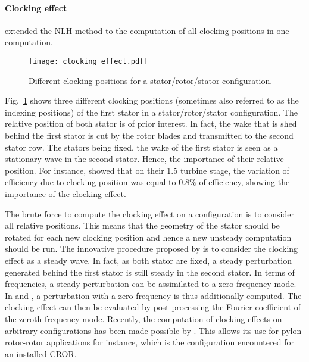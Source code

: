 \paragraph{Clocking effect}
\citet{He2002} extended the NLH method to
the computation of all clocking positions in one computation.
\begin{figure}[htbp]
  \centering 
  \texttt{[image: clocking\_effect.pdf]}
  \caption{Different clocking positions for a stator/rotor/stator
  configuration.}
  \label{fig:sm_nlh_clocking_effect}
\end{figure}
Fig.~\ref{fig:sm_nlh_clocking_effect} shows three
different clocking positions (sometimes also referred 
to as the indexing positions)
of the first stator
in a stator/rotor/stator configuration.
The relative position of both stator is of
prior interest. In fact, the wake that is shed behind the first stator
is cut by the rotor blades and transmitted to 
the second stator row. The stators being fixed, the wake of
the first stator is seen as a stationary wave in the second stator.
Hence, the importance of their relative position. For instance,
\citet{Huber1996} showed that
on their 1.5 turbine stage, the variation of efficiency due to clocking
position was equal to $0.8\%$ of efficiency, showing the
importance of the clocking effect.

The brute force to compute the clocking effect on a
configuration is to consider all relative positions. This means
that the geometry of the stator should be rotated for each new 
clocking position and hence a new unsteady computation should be 
run. The innovative procedure proposed by 
\citet{He2002} is to consider the clocking effect as a steady wave.
In fact, as both stator are fixed, a steady perturbation
generated behind the first stator is still steady in the second stator.
In terms of frequencies, a steady perturbation
can be assimilated to a zero frequency mode. 
In \citet{He2002} and \citet{Vilmin2009}, 
a perturbation with a zero frequency
is thus additionally computed. The clocking effect can then be evaluated by
post-processing the Fourier coefficient of the zeroth frequency mode.
Recently, the computation of clocking effects on
arbitrary configurations has been made possible
by \citet{Vilmin2013a}. This allows its use for 
pylon-rotor-rotor applications for instance, which
is the configuration encountered for an installed CROR.

